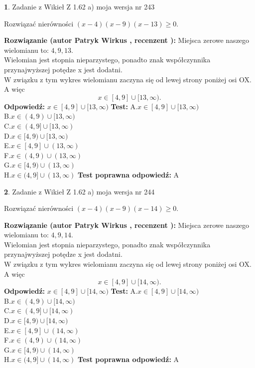 \documentclass[12pt, a4paper]{article}
\theoremstyle{definition} %
\newtheorem{zad}{}
\newcommand{\zadStart}[1]{\begin{zad}#1\newline}
\newcommand{\zadStop}{\end{zad}}
\newcommand{\rozwStart}[2]{\noindent \textbf{Rozwiązanie (autor #1 , recenzent #2): }\newline}
\newcommand{\rozwStop}{\newline}
\newcommand{\odpStart}{\noindent \textbf{Odpowiedź:}\newline}
\newcommand{\odpStop}{\newline}
\newcommand{\testStart}{\noindent \textbf{Test:}\newline}
\newcommand{\testStop}{\newline}
\newcommand{\kluczStart}{\noindent \textbf{Test poprawna odpowiedź:}\newline}
\newcommand{\kluczStop}{\newline}
\begin{document}
\zadStart{Zadanie z Wikieł Z 1.62 a) moja wersja nr 243}

Rozwiązać nierówności $(x-4)(x-9)(x-13)\ge0$.
\zadStop
\rozwStart{Patryk Wirkus}{}
Miejsca zerowe naszego wielomianu to: $4, 9, 13$.\\
Wielomian jest stopnia nieparzystego, ponadto znak współczynnika przy\linebreak najwyższej potędze x jest dodatni.\\ W związku z tym wykres wielomianu zaczyna się od lewej strony poniżej osi OX. A więc $$x \in [4,9] \cup [13,\infty).$$
\rozwStop
\odpStart
$x \in [4,9] \cup [13,\infty)$
\odpStop
\testStart
A.$x \in [4,9] \cup [13,\infty)$\\
B.$x \in (4,9) \cup [13,\infty)$\\
C.$x \in (4,9] \cup [13,\infty)$\\
D.$x \in [4,9) \cup [13,\infty)$\\
E.$x \in [4,9] \cup (13,\infty)$\\
F.$x \in (4,9) \cup (13,\infty)$\\
G.$x \in [4,9) \cup (13,\infty)$\\
H.$x \in (4,9] \cup (13,\infty)$
\testStop
\kluczStart
A
\kluczStop



\zadStart{Zadanie z Wikieł Z 1.62 a) moja wersja nr 244}

Rozwiązać nierówności $(x-4)(x-9)(x-14)\ge0$.
\zadStop
\rozwStart{Patryk Wirkus}{}
Miejsca zerowe naszego wielomianu to: $4, 9, 14$.\\
Wielomian jest stopnia nieparzystego, ponadto znak współczynnika przy\linebreak najwyższej potędze x jest dodatni.\\ W związku z tym wykres wielomianu zaczyna się od lewej strony poniżej osi OX. A więc $$x \in [4,9] \cup [14,\infty).$$
\rozwStop
\odpStart
$x \in [4,9] \cup [14,\infty)$
\odpStop
\testStart
A.$x \in [4,9] \cup [14,\infty)$\\
B.$x \in (4,9) \cup [14,\infty)$\\
C.$x \in (4,9] \cup [14,\infty)$\\
D.$x \in [4,9) \cup [14,\infty)$\\
E.$x \in [4,9] \cup (14,\infty)$\\
F.$x \in (4,9) \cup (14,\infty)$\\
G.$x \in [4,9) \cup (14,\infty)$\\
H.$x \in (4,9] \cup (14,\infty)$
\testStop
\kluczStart
A
\kluczStop
\end{document}
